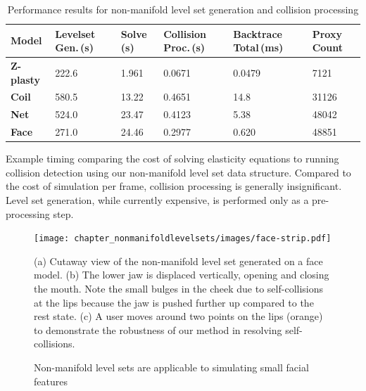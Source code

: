 \begin{table}[h!]
\begin{center}
\setlength\fboxsep{0pt}
\setlength\fboxrule{0.25pt}
\sffamily
\begin{tabular}{
 >{}l
 >{}m{2cm}
 >{}l 
 >{}m{2cm} 
 >{}m{2cm} 
 >{}m{1cm} }
\toprule
\textbf{Model}& \textbf{Level\;set Gen.\,(s)} & \textbf{Solve\,(s)} & \textbf{Collision Proc.\,(s)} & \textbf{Backtrace Total\,(ms)} & \textbf{Proxy Count}\\
\midrule
\textbf{Z-plasty}& 222.6 &  1.961 & 0.0671 & 0.0479 & 7121\\
\midrule
\textbf{Coil}& 580.5 & 13.22 & 0.4651 & 14.8 & 31126\\
\midrule
\textbf{Net}& 524.0 & 23.47 & 0.4123 & 5.38 & 48042\\
\midrule
\textbf{Face}& 271.0 & 24.46 & 0.2977 & 0.620 & 48851\\
\bottomrule
\end{tabular}
\end{center}
\vspace*{-.1in}
\caption{Performance results for non-manifold level set generation and
  collision processing}{Example timing comparing the cost of solving
  elasticity equations to running collision detection using our
  non-manifold level set data structure. Compared to the cost of
  simulation per frame, collision processing is generally
  insignificant. Level set generation, while currently expensive,
  is performed only as a pre-processing step.}
\label{tab:compute-times}
\end{table}


\begin{figure}
  \centering
\texttt{[image: chapter\_nonmanifoldlevelsets/images/face-strip.pdf]}
\vspace*{-.1in}
\caption{Non-manifold level sets are applicable to simulating small
  facial features}{(a) Cutaway view of the non-manifold level set
  generated on a face model. (b) The lower jaw is displaced
  vertically, opening and closing the mouth. Note the small bulges in
  the cheek due to self-collisions at the lips because the jaw is
  pushed further up compared to the rest state.  (c) A user moves
  around two points on the lips (orange) to demonstrate the robustness
  of our method in resolving self-collisions. }
\label{fig:face}
\vspace*{-.15in}
\end{figure}

